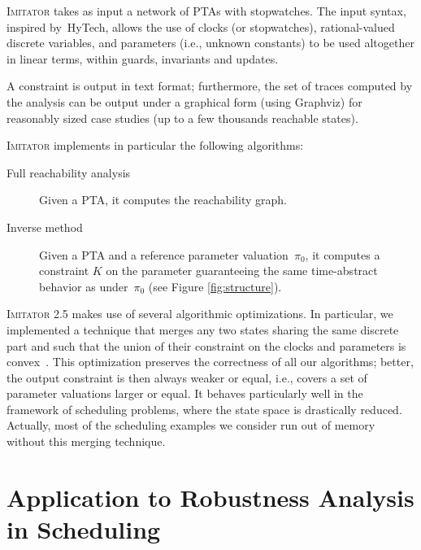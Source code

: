 \documentclass{llncs}
\newcommand{\pio}{\pi_0}
\newcommand{\IM}{\mathit{IM}}
\newcommand{\graphviz}{Graphviz}
\newcommand{\hytech}{{\sc HyTech}}
\newcommand{\imitator}{\textsc{Imitator}}
\begin{document}
\imitator{} takes as input a network of PTAs with stopwatches.
The input syntax, inspired by~\hytech{}, allows the use of clocks (or stopwatches), rational-valued discrete variables, and parameters (i.e., unknown constants) to be used altogether in linear terms, within guards, invariants and updates.

A constraint is output in text format; furthermore, the set of traces computed by the analysis can be output under a graphical form (using \graphviz{}) for reasonably sized case studies (up to a few thousands reachable states).

\imitator{} implements in particular the following algorithms:
\begin{description}
	\item[Full reachability analysis] Given a PTA, it computes the reachability graph.
	\item[Inverse method] Given a PTA and a reference parameter valuation~$\pio$, it computes a constraint $K$ on the parameter guaranteeing the same time-abstract behavior as under~$\pio$ (see Figure \ref{fig:structure}).
\end{description}

\imitator{} 2.5 makes use of several algorithmic optimizations.
In particular, we implemented a technique that merges any two states sharing the same discrete part %
and such that the union of their constraint on the clocks and parameters is convex~\cite{AFS12}.
This optimization preserves the correctness of all our algorithms; better, the output constraint 
is then always weaker or equal, i.e., covers a set of parameter valuations larger or equal.
It behaves particularly well in the framework of scheduling problems, where the state space is drastically reduced.
Actually, most of the scheduling examples we consider run out of memory without this merging technique.




\section{Application to Robustness Analysis in  Scheduling}
\end{document}
